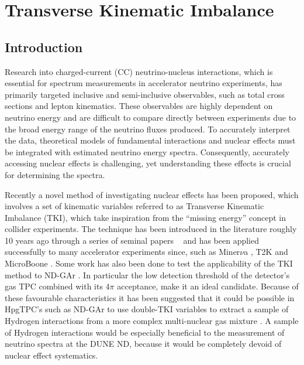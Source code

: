 \begin{savequote}[8cm]
\end{savequote}

\chapter{\label{ch:6-TKI}Transverse Kinematic Imbalance}


\minitoc
\section{Introduction}
Research into charged-current (CC) neutrino-nucleus interactions, which is essential for spectrum measurements in accelerator neutrino experiments, has primarily targeted inclusive and semi-inclusive observables, such as total cross sections and lepton kinematics. These observables are highly dependent on neutrino energy and are difficult to compare directly between experiments due to the broad energy range of the neutrino fluxes produced. To accurately interpret the data, theoretical models of fundamental interactions and nuclear effects must be integrated with estimated neutrino energy spectra. Consequently, accurately accessing nuclear effects is challenging, yet understanding these effects is crucial for determining the spectra. 

Recently a novel method of investigating nuclear effects has been proposed, which involves a set of kinematic variables referred to as Transverse Kinematic Imbalance (TKI), which take inspiration from the \enquote{missing energy} concept in collider experiments. The technique has been introduced in the literature roughly 10 years ago through a series of seminal papers ~\cite{Lu:2015hea, PhysRevC.94.015503, PhysRevC.99.055504, Cai:2019jzk} and has been applied successfully to many accelerator experiments since, such as Miner$\nu$a \cite{MINERvA:2018hba, MINERvA:2019ope, MINERvA:2020anu}, T2K \cite{T2K:2018rnz, T2K:2019yqu} and MicroBoone \cite{MicroBooNE:2023tzj}. Some work has also been done to test the applicability of the TKI method to ND-GAr \cite{DUNE:2021NDCDR}. In particular the low detection threshold of the detector's gas TPC combined with its $4\pi$ acceptance, make it an ideal candidate. Because of these favourable characteristics it has been suggested that it could be possible in HpgTPC's such as ND-GAr to use double-TKI variables to extract a sample of Hydrogen  interactions from a more complex multi-nuclear gas mixture \cite{Lu}. A sample of Hydrogen interactions would be especially beneficial to the measurement of neutrino spectra at the DUNE ND, because it would be completely devoid of nuclear effect systematics. 

